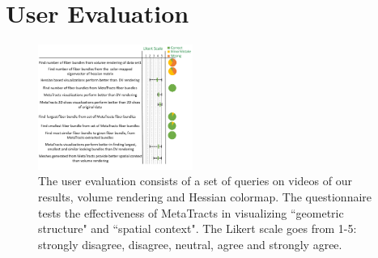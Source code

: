 \section {User Evaluation}
\label {sec:user_eval}
\begin{figure}[tb]
	\centering
	\includegraphics[width=0.45\textwidth,  trim = 0mm 60mm 0mm 0mm, clip]{images_pvis/usereval}
	\caption{The user evaluation consists of a set of queries on videos of our results, volume rendering and Hessian colormap. The questionnaire tests the effectiveness of MetaTracts in visualizing ``geometric structure" and ``spatial context". The Likert scale goes from 1-5: strongly disagree, disagree, neutral, agree and strongly agree. }
	\label{fig:userstudy}
\end{figure}

